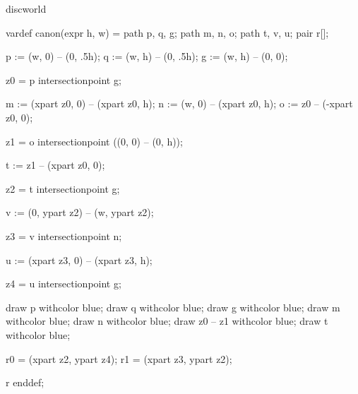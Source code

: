 

\startenvironment discworld

	\startMPdefinitions
		vardef canon(expr h, w) =
			path p, q, g;
			path m, n, o;
			path t, v, u;
			pair r[];

			p := (w,  0) -- (0, .5h); %
			q := (w,  h) -- (0, .5h); %
			g := (w,  h) -- (0, 0); %

			z0 = p intersectionpoint g; %

			m := (xpart z0, 0) -- (xpart z0, h); %
			n := (w, 0) -- (xpart z0, h); %
			o := z0 -- (-xpart z0, 0); %

			z1 = o intersectionpoint ((0, 0) -- (0, h)); %

			t := z1 -- (xpart z0, 0); %

			z2 = t intersectionpoint g; %

			v := (0, ypart z2) -- (w, ypart z2); %

			z3 = v intersectionpoint n; %

			u := (xpart z3, 0) -- (xpart z3, h); %

			z4 = u intersectionpoint g; %

			draw p withcolor blue;
			draw q withcolor blue;
			draw g withcolor blue;
			draw m withcolor blue;
			draw n withcolor blue;
			draw z0 -- z1 withcolor blue;
			draw t withcolor blue;

			r0 = (xpart z2, ypart z4); %
			r1 = (xpart z3, ypart z2); %

			r
		enddef;

	\stopMPdefinitions

\stopenvironment

